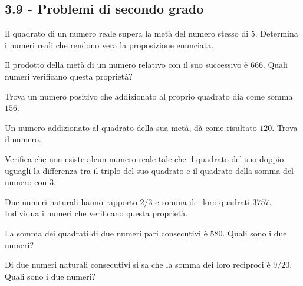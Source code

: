\begin{multicols}{2}
\subsection*{3.9 - Problemi di secondo grado}

\begin{esercizio}[\Ast]
 \label{ese:3.112}
Il quadrato di un numero reale supera la metà del numero stesso di $ 5 $.
Determina i numeri reali che rendono vera la proposizione enunciata.
\end{esercizio}

\begin{esercizio}[\Ast]
 \label{ese:3.113}
Il prodotto della metà di un numero relativo con il suo successivo è $ 666 $.
Quali numeri verificano questa proprietà?
\end{esercizio}

\begin{esercizio}
 \label{ese:3.114}
Trova un numero positivo che addizionato al proprio quadrato dia come somma $ 156 $.
\end{esercizio}

\begin{esercizio}
 \label{ese:3.115}
Un numero addizionato al quadrato della sua metà, dà come risultato $ 120 $.
Trova il numero.
\end{esercizio}

\begin{esercizio}
 \label{ese:3.116}
Verifica che non esiste alcun numero reale tale che il quadrato del suo
doppio uguagli la differenza tra il triplo del suo quadrato e il quadrato
della somma del numero con $ 3 $.
\end{esercizio}

\begin{esercizio}[\Ast]
 \label{ese:3.117}
Due numeri naturali hanno rapporto $ 2/3 $ e somma dei loro quadrati $ 3757 $.
Individua i numeri che verificano questa proprietà.
\end{esercizio}

\begin{esercizio}[\Ast]
 \label{ese:3.118}
La somma dei quadrati di due numeri pari consecutivi è $ 580 $. Quali sono i
due numeri?
\end{esercizio}

\begin{esercizio}[\Ast]
 \label{ese:3.119}
Di due numeri naturali consecutivi si sa che la somma dei loro reciproci
è $ 9/20 $. Quali sono i due numeri?
\end{esercizio}


\end{multicols}

